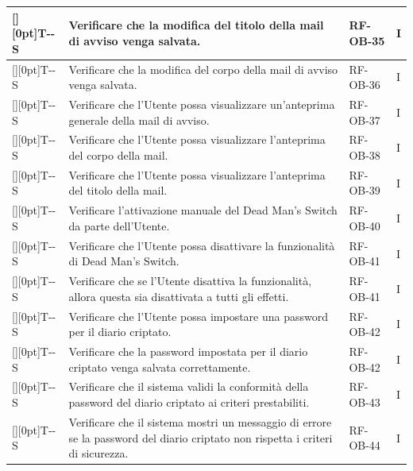 \documentclass[a4paper,12pt]{article}
\newcounter{testsys}
\newcommand{\systestcode}{%
  \raisebox{0pt}[\height][0pt]{\hypertarget{T-\arabic{testsys}-S}{}}T-\arabic{testsys}-S%
}
\begin{document}
\begin{longtable}{| >{\centering\arraybackslash}p{} | >{\raggedright\arraybackslash}p{} | >{\centering\arraybackslash}p{} | >{\centering\arraybackslash}p{} |}
\stepcounter{testsys} \systestcode & Verificare che la modifica del titolo della mail di avviso venga salvata. & RF-OB-35 & I \\
\hline

\stepcounter{testsys} \systestcode & Verificare che la modifica del corpo della mail di avviso venga salvata. & RF-OB-36 & I \\
\hline

\stepcounter{testsys} \systestcode & Verificare che l'Utente possa visualizzare un'anteprima generale della mail di avviso. & RF-OB-37 & I \\
\hline

\stepcounter{testsys} \systestcode & Verificare che l'Utente possa visualizzare l'anteprima del corpo della mail. & RF-OB-38 & I \\
\hline

\stepcounter{testsys} \systestcode & Verificare che l'Utente possa visualizzare l'anteprima del titolo della mail. & RF-OB-39 & I \\
\hline

\stepcounter{testsys} \systestcode & Verificare l'attivazione manuale del Dead Man's Switch da parte dell'Utente. & RF-OB-40 & I \\
\hline

\stepcounter{testsys} \systestcode & Verificare che l'Utente possa disattivare la funzionalità di Dead Man's Switch. & RF-OB-41 & I \\
\hline

\stepcounter{testsys} \systestcode & Verificare che se l'Utente disattiva la funzionalità, allora questa sia disattivata a tutti gli effetti. & RF-OB-41 & I \\
\hline

\stepcounter{testsys} \systestcode & Verificare che l'Utente possa impostare una password per il diario criptato. & RF-OB-42 & I \\
\hline

\stepcounter{testsys} \systestcode & Verificare che la password impostata per il diario criptato venga salvata correttamente. & RF-OB-42 & I \\
\hline

\stepcounter{testsys} \systestcode & Verificare che il sistema validi la conformità della password del diario criptato ai criteri prestabiliti. & RF-OB-43 & I \\
\hline

\stepcounter{testsys} \systestcode & Verificare che il sistema mostri un messaggio di errore se la password del diario criptato non rispetta i criteri di sicurezza. & RF-OB-44 & I \\
\hline


\end{longtable}
\end{document}
